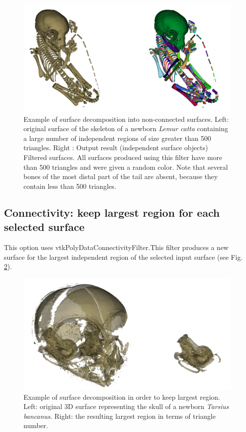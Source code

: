 \begin{figure}
  \centering
  \includegraphics[scale=0.35]{images/09/structure/surface_decomposition_example.png} 
	\caption{Example of surface decomposition into non-connected surfaces. Left: original surface of the skeleton of a newborn \textit{Lemur catta} containing a large number of independent regions of size greater than 500 triangles. Right : Output result (independent surface objects) Filtered surfaces. All surfaces produced using this filter have more than 500 triangles and were given a random color. Note that several bones of the most distal part of the tail are absent, because they contain less than 500 triangles. }
\label{decompose34}
 
\end{figure}






\subsection{Connectivity: keep largest region for each selected surface}
This option uses vtkPolyDataConnectivityFilter.This filter produces a new surface for the largest independent region of the selected input surface (see Fig. \ref{largest_region}).

\begin{figure}
  \centering
  \includegraphics[scale=0.31]{images/09/structure/keep_largest.png} 
	\caption{Example of surface decomposition in order to keep largest region. Left: original 3D surface representing the skull of a newborn \textit{Tarsius bancanus}. Right: the resulting largest region in terms of triangle number.}
\label{largest_region}
 
\end{figure}


